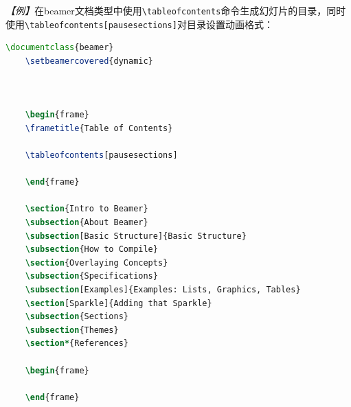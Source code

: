 \emph{【例】}在beamer文档类型中使用\texttt{\textbackslash{}tableofcontents}命令生成幻灯片的目录，同时使用\texttt{\textbackslash{}tableofcontents[pausesections]}对目录设置动画格式：
\begin{lstlisting}[language=TeX]
    \documentclass{beamer}
    \setbeamercovered{dynamic}

    

    \begin{frame}
    \frametitle{Table of Contents}

    \tableofcontents[pausesections]

    \end{frame}

    \section{Intro to Beamer}
    \subsection{About Beamer}
    \subsection[Basic Structure]{Basic Structure}
    \subsection{How to Compile}
    \section{Overlaying Concepts}
    \subsection{Specifications}
    \subsection[Examples]{Examples: Lists, Graphics, Tables}
    \section[Sparkle]{Adding that Sparkle}
    \subsection{Sections}
    \subsection{Themes}
    \section*{References}

    \begin{frame}

    \end{frame}

    
\end{lstlisting}

